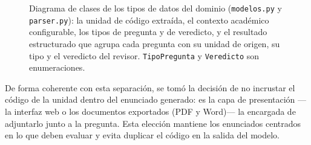 \begin{figure}[htbp]
  \centering
  \caption[Diagrama de clases del modelo de dominio.]{Diagrama de clases de los
  tipos de datos del dominio (\texttt{modelos.py} y \texttt{parser.py}): la
  unidad de código extraída, el contexto académico configurable, los tipos de
  pregunta y de veredicto, y el resultado estructurado que agrupa cada pregunta
  con su unidad de origen, su tipo y el veredicto del revisor. \texttt{TipoPregunta}
  y \texttt{Veredicto} son enumeraciones.}
  \label{fig:clases-dominio}
\end{figure}

De forma coherente con esta separación, se tomó la decisión de no
incrustar el código de la unidad dentro del enunciado generado: es la capa
de presentación ---la interfaz web o los documentos exportados (PDF y
Word)--- la encargada de adjuntarlo junto a la pregunta. Esta elección mantiene los enunciados
centrados en lo que deben evaluar y evita duplicar el código en la salida
del modelo.


